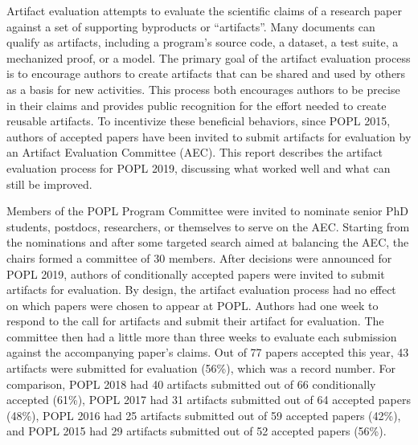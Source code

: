 \label{aec}


Artifact evaluation attempts to evaluate the scientific claims of a
research paper against a set of supporting byproducts or
``artifacts''. Many documents can qualify as artifacts, including a
program’s source code, a dataset, a test suite, a mechanized proof, or
a model. The primary goal of the artifact evaluation process is to
encourage authors to create artifacts that can be shared and used by
others as a basis for new activities. This process both encourages
authors to be precise in their claims and provides public recognition
for the effort needed to create reusable artifacts. To incentivize
these beneficial behaviors, since POPL 2015, authors of accepted
papers have been invited to submit artifacts for evaluation by an
Artifact Evaluation Committee (AEC). This report describes the
artifact evaluation process for POPL 2019, discussing what worked well
and what can still be improved.

Members of the POPL Program Committee were invited to nominate senior PhD
students, postdocs, researchers, or themselves to serve on the AEC.
Starting from the nominations and after some targeted search aimed at
balancing the AEC, the chairs formed a committee of 30 members. After
decisions were announced for POPL 2019, authors of conditionally
accepted papers were invited to submit artifacts for evaluation. By
design, the artifact evaluation process had no effect on which papers
were chosen to appear at POPL.  Authors had one week to respond to the
call for artifacts and submit their artifact for evaluation. The
committee then had a little more than three weeks to evaluate each
submission against the accompanying paper's claims.
Out of 77 papers accepted this year, 43 artifacts were submitted for
evaluation (56\%), which was a record number. For comparison, POPL
2018 had 40 artifacts submitted out of 66 conditionally accepted
(61\%), POPL 2017 had 31 artifacts submitted out of 64 accepted papers
(48\%), POPL 2016 had 25 artifacts submitted out of 59 accepted papers
(42\%), and POPL 2015 had 29 artifacts submitted out of 52 accepted
papers (56\%).


